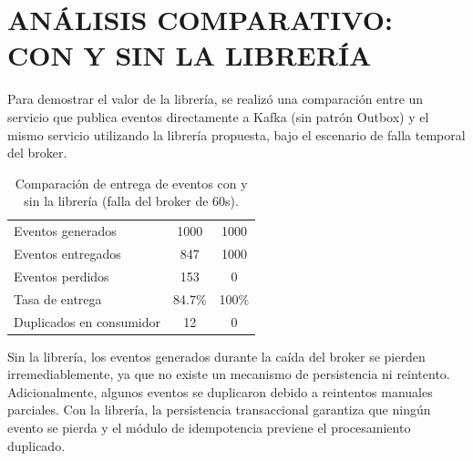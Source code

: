 \section{ANÁLISIS COMPARATIVO: CON Y SIN LA LIBRERÍA}

Para demostrar el valor de la librería, se realizó una comparación entre un servicio que publica eventos directamente a Kafka (sin patrón Outbox) y el mismo servicio utilizando la librería propuesta, bajo el escenario de falla temporal del broker.

\begin{table}[H]
    \centering
    \caption{Comparación de entrega de eventos con y sin la librería (falla del broker de 60s).}
    \small
    \begin{tabularx}{0.92\textwidth}{@{} Y c c @{}}
        \toprule
         &  &  \\
        \midrule
        Eventos generados & 1000 & 1000 \\
        Eventos entregados & 847 & 1000 \\
        Eventos perdidos & 153 & 0 \\
        Tasa de entrega & 84.7\% & 100\% \\
        Duplicados en consumidor & 12 & 0 \\
        \bottomrule
    \end{tabularx}
    \label{tab:comparacion_con_sin}
\end{table}

Sin la librería, los eventos generados durante la caída del broker se pierden irremediablemente, ya que no existe un mecanismo de persistencia ni reintento. Adicionalmente, algunos eventos se duplicaron debido a reintentos manuales parciales. Con la librería, la persistencia transaccional garantiza que ningún evento se pierda y el módulo de idempotencia previene el procesamiento duplicado.

